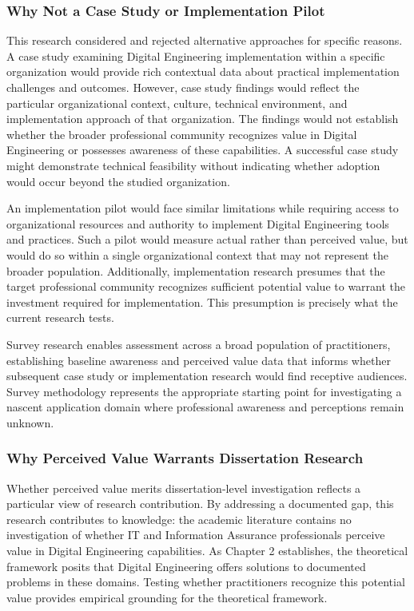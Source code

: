 \subsubsection{Why Not a Case Study or Implementation Pilot}

This research considered and rejected alternative approaches for specific reasons. A case study examining Digital Engineering implementation within a specific organization would provide rich contextual data about practical implementation challenges and outcomes. However, case study findings would reflect the particular organizational context, culture, technical environment, and implementation approach of that organization. The findings would not establish whether the broader professional community recognizes value in Digital Engineering or possesses awareness of these capabilities. A successful case study might demonstrate technical feasibility without indicating whether adoption would occur beyond the studied organization.

An implementation pilot would face similar limitations while requiring access to organizational resources and authority to implement Digital Engineering tools and practices. Such a pilot would measure actual rather than perceived value, but would do so within a single organizational context that may not represent the broader population. Additionally, implementation research presumes that the target professional community recognizes sufficient potential value to warrant the investment required for implementation. This presumption is precisely what the current research tests.

Survey research enables assessment across a broad population of practitioners, establishing baseline awareness and perceived value data that informs whether subsequent case study or implementation research would find receptive audiences. Survey methodology represents the appropriate starting point for investigating a nascent application domain where professional awareness and perceptions remain unknown.

\subsubsection{Why Perceived Value Warrants Dissertation Research}

Whether perceived value merits dissertation-level investigation reflects a particular view of research contribution. By addressing a documented gap, this research contributes to knowledge: the academic literature contains no investigation of whether IT and Information Assurance professionals perceive value in Digital Engineering capabilities. As Chapter 2 establishes, the theoretical framework posits that Digital Engineering offers solutions to documented problems in these domains. Testing whether practitioners recognize this potential value provides empirical grounding for the theoretical framework.


